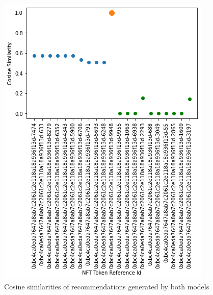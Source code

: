 \documentclass[conference]{IEEEtran}
\begin{document}
\begin{figure}[htbp]
\centerline{\includegraphics[width=\linewidth]{images/Cosine Similarities of Recommended NFTs (Trait Content Based + Total Rarity Recomendations Models).png}}
\caption{Cosine similarities of recommendations generated by both models}
\label{fig:combined-cosine}
\end{figure}
\end{document}

